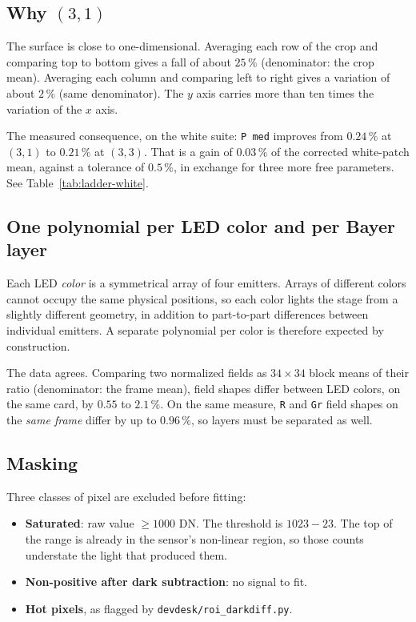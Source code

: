 \documentclass[11pt, a4paper]{article}
\newcommand{\code}[1]{\texttt{#1}}
\newcommand{\pct}{\,\%}
\begin{document}
\subsection{Why $(3,1)$}

The surface is close to one-dimensional.
Averaging each row of the crop and comparing top to bottom
gives a fall of about $25\pct$
(denominator: the crop mean).
Averaging each column and comparing left to right
gives a variation of about $2\pct$
(same denominator).
The $y$ axis carries more than ten times the variation of the $x$ axis.

The measured consequence, on the white suite:
\code{P med} improves from $0.24\pct$ at $(3,1)$ to $0.21\pct$ at $(3,3)$.
That is a gain of $0.03\pct$ of the corrected white-patch mean,
against a tolerance of $0.5\pct$,
in exchange for three more free parameters.
See Table~\ref{tab:ladder-white}.

\subsection{One polynomial per LED color and per Bayer layer}

Each LED \emph{color} is a symmetrical array of four emitters.
Arrays of different colors cannot occupy the same physical positions,
so each color lights the stage from a slightly different geometry,
in addition to part-to-part differences between individual emitters.
A separate polynomial per color is therefore expected by construction.

The data agrees.
Comparing two normalized fields as $34\times34$ block means of their ratio
(denominator: the frame mean),
field shapes differ between LED colors,
on the same card,
by $0.55$ to $2.1\pct$.
On the same measure,
\code{R} and \code{Gr} field shapes on the \emph{same frame}
differ by up to $0.96\pct$,
so layers must be separated as well.

\subsection{Masking}
\label{sec:masking}

Three classes of pixel are excluded before fitting:

\begin{itemize}[nosep]
  \item \textbf{Saturated}: raw value $\ge 1000$ DN.
        The threshold is $1023 - 23$.
        The top of the range is already in the sensor's non-linear region,
        so those counts understate the light that produced them.
  \item \textbf{Non-positive after dark subtraction}: no signal to fit.
  \item \textbf{Hot pixels}, as flagged by \code{devdesk/roi\_darkdiff.py}.
\end{itemize}
\end{document}
